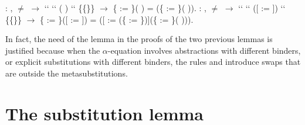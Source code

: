 \begin{coqdoccode}
\coqdocemptyline
\coqdocnoindent
{} : \coqdockw{\ensuremath{\forall}}     ,  \ensuremath{\not=}  \ensuremath{\rightarrow}  ``   ``  (  ) `` \{\{\}\} \ensuremath{\rightarrow} \{ := \}(  ) =   (\{ := \}(   )).\coqdoceol
\coqdocemptyline
\coqdocnoindent
{}  : \coqdockw{\ensuremath{\forall}}      ,  \ensuremath{\not=}  \ensuremath{\rightarrow}  ``   ``  ([ := ]) `` \{\{\}\} \ensuremath{\rightarrow} \{ := \}([ := ]) = ([ := (\{ := \})](\{ := \}(   ))).\coqdoceol
\coqdocemptyline
\end{coqdoccode}
In fact, the need of the lemma  in the proofs of the two previous lemmas is justified because when the $\alpha$-equation involves abstractions with different binders, or explicit substitutions with different binders, the rules  and  introduce swaps that are outside the metasubstitutions. 
\begin{coqdoccode}
\coqdocemptyline
\coqdocemptyline
\end{coqdoccode}
\section{The substitution lemma}



